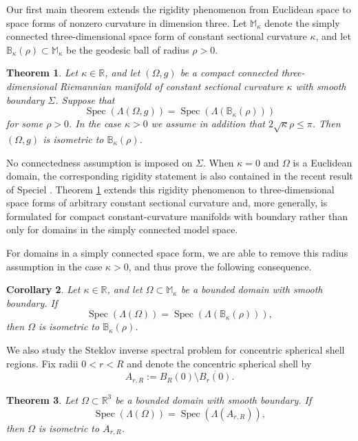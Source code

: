 \documentclass[11pt]{amsart}
\newcommand{\Spec}{\operatorname{Spec}}
\newtheorem{theorem}{Theorem}[section]
\newtheorem{corollary}[theorem]{Corollary}
\theoremstyle{definition}
\numberwithin{equation}{section}
\begin{document}
	Our first main theorem extends the rigidity phenomenon from Euclidean space to space forms of nonzero curvature in dimension three. Let $\mathbb M_\kappa$ denote the simply connected three-dimensional space form of constant sectional curvature $\kappa$, and let $\mathbb B_\kappa(\rho)\subset\mathbb M_\kappa$ be the
	geodesic ball of radius $\rho>0$. 
	
	\begin{theorem}
		\label{thm: determine 3d geodesic balls}
		Let $\kappa\in\mathbb R$, and let $(\Omega,g)$ be a compact connected three-dimensional Riemannian manifold of constant sectional curvature $\kappa$ with smooth boundary $\Sigma$.  Suppose that
		\[
		\Spec(\Lambda(\Omega,g)) = \Spec(\Lambda(\mathbb B_\kappa(\rho)))
		\]
		for some $\rho>0$.  In the case $\kappa > 0$ we assume  in addition that $2\sqrt{\kappa}\rho\le\pi$. 
		Then $(\Omega,g)$ is isometric to $\mathbb B_\kappa(\rho)$.  
	\end{theorem}
	
	No connectedness assumption is imposed on $\Sigma$. When $\kappa=0$ and $\Omega$ is a Euclidean domain, the corresponding rigidity statement is also contained in the recent result of Speciel \cite{specielSteklovRigidityEuclidean2026}. Theorem \ref{thm: determine 3d geodesic balls} extends this rigidity phenomenon to three-dimensional space forms of arbitrary constant sectional curvature and, more generally, is formulated for compact constant-curvature manifolds with boundary rather than only for domains in the simply connected model space.
	  
	
	For domains in a simply connected space form, we are able to remove this radius assumption in the case $\kappa>0$, and thus prove the following consequence. 
	
	\begin{corollary}
		\label{cor: determine 3d geodesic balls in orientable space forms}
		Let $\kappa\in\mathbb R$, and let $\Omega\subset \mathbb M_\kappa$ be a bounded domain with smooth boundary.  If
		\[
		\Spec(\Lambda(\Omega)) = \Spec(\Lambda(\mathbb B_\kappa(\rho))),
		\]
		then $\Omega$ is isometric to $\mathbb B_\kappa(\rho)$.
	\end{corollary}
	
	We also study the Steklov inverse spectral problem for  concentric spherical shell regions. Fix radii $0<r<R$ and denote the concentric spherical shell by
	\[
	A_{r,R}:=B_R(0)\setminus \overline{B_r(0)}.
	\]
	
	\begin{theorem}\label{thm:concentric_spherical_shell_inverse}
		Let $\Omega\subset \mathbb R^3$ be a bounded domain with smooth boundary.  If
		 \[
		 \Spec(\Lambda(\Omega)) = \Spec(\Lambda(A_{r,R})),
		 \]
		 then $\Omega$ is isometric to $A_{r,R}$.
	\end{theorem}
	
\end{document}
